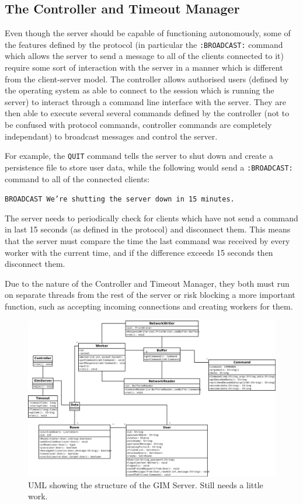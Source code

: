 \subsection{The Controller and Timeout Manager}
Even though the server should be capable of functioning autonomously, some of the features defined by the protocol (in particular the \texttt{:BROADCAST:} command which allows the server to send a message to all of the clients connected to it) require some sort of interaction with the server in a manner which is different from the client-server model. The controller allows authorised users (defined by the operating system as able to connect to the session which is running the server) to interact through a command line interface with the server. They are then able to execute several several commands defined by the controller (not to be confused with protocol commands, controller commands are completely independant) to broadcast messages and control the server. 

For example, the \texttt{QUIT} command tells the server to shut down and create a persistence file to store user data, while the following would send a \texttt{:BROADCAST:} command to all of the connected clients:

\texttt{BROADCAST We're shutting the server down in 15 minutes.}

The server needs to periodically check for clients which have not send a command in last 15 seconds (as defined in the protocol) and disconnect them. This means that the server must compare the time the last command was received by every worker with the current time, and if the difference exceeds 15 seconds then disconnect them.

Due to the nature of the Controller and Timeout Manager, they both must run on separate threads from the rest of the server or risk blocking a more important function, such as accepting incoming connections and creating workers for them.

\begin{landscape}
    \begin{figure}
        \begin{center}
            \includegraphics[scale=0.5]{Design/diagrams/server_uml.png}
            \caption{UML showing the structure of the GIM Server. Still needs a little work.}
            \label{highLevelDia}
        \end{center}
    \end{figure}
\end{landscape}
